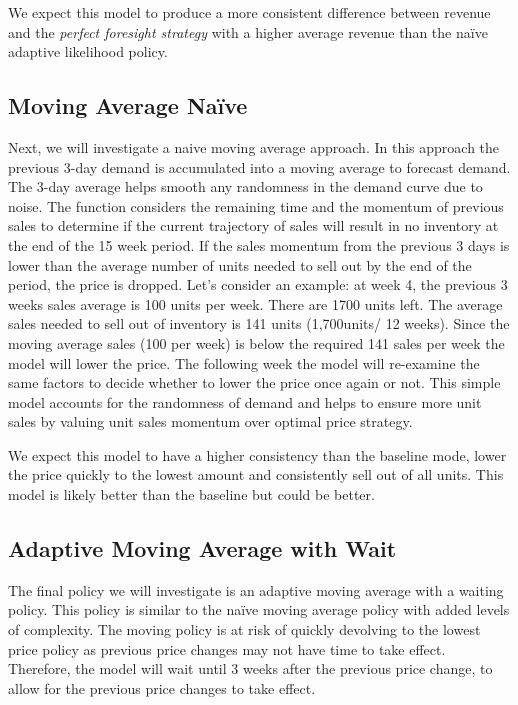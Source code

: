 \documentclass[11pt,a4paper]{article}
\begin{document}
We expect this model to produce a more consistent difference between revenue and the \emph{perfect foresight strategy} with a higher average revenue than the naïve adaptive likelihood policy.

\subsection{Moving Average Naïve}
Next, we will investigate a naive moving average approach. 
In this approach the previous 3-day demand is accumulated into a moving average to forecast demand.
The 3-day average helps smooth any randomness in the demand curve due to noise. 
The function considers the remaining time and the momentum of previous sales to determine if the current trajectory of sales will result in no inventory at the end of the 15 week period. 
If the sales momentum from the previous 3 days is lower than the average number of units needed to sell out by the end of the period, the price is dropped. 
Let’s consider an example: at week 4, the previous 3 weeks sales average is 100 units per week. There are 1700 units left. 
The average sales needed to sell out of inventory is 141 units (1,700units/ 12 weeks). 
Since the moving average sales (100 per week) is below the required 141 sales per week the model will lower the price. 
The following week the model will re-examine the same factors to decide whether to lower the price once again or not. 
This simple model accounts for the randomness of demand and helps to ensure more unit sales by valuing unit sales momentum over optimal price strategy.

We expect this model to have a higher consistency than the baseline mode, lower the price quickly to the lowest amount and consistently sell out of all units. This model is likely better than the baseline but could be better.

\subsection{Adaptive Moving Average with Wait}
The final policy we will investigate is an adaptive moving average with a waiting policy. 
This policy is similar to the naïve moving average policy with added levels of complexity. 
The moving policy is at risk of quickly devolving to the lowest price policy as previous price changes may not have time to take effect. 
Therefore, the model will wait until 3 weeks after the previous price change, to allow for the previous price changes to take effect.
\end{document}
